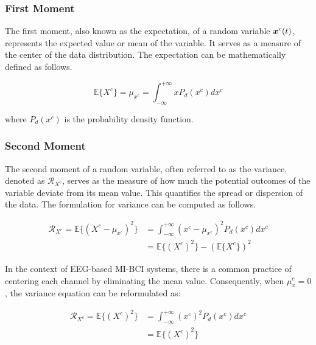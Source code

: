 \subsubsection{First Moment}

The first moment, also known as the expectation, of a random variable $\bm {x}^c(t)$, represents the expected value or mean of the variable. It serves as a measure of the center of the data distribution. The expectation can be mathematically defined as follows.

\begin{equation}
    \mathbb{E}\{X^{c}\} = \mu_{x^{c}} = \int_{-\infty}^{+\infty} x P_d(x^{c}) dx^{c}
\end{equation}

where $P_d(x^{c})$ is the probability density function.

\subsubsection{Second Moment}

The second moment of a random variable, often referred to as the variance, denoted as $\mathcal{R}_{X^c}$, serves as the measure of how much the potential outcomes of the variable deviate from its mean value. This quantifies the spread or dispersion of the data. The formulation for variance can be computed as follows.

\begin{equation}
  \begin{split}
    \mathcal{R}_{X^c} = \mathbb{E}\{(X^{c} - \mu_{x^{c}})^2\} &= \int_{-\infty}^{+\infty} \left( x^{c}-\mu_{x^{c}} \right) ^2 P_d(x^{c}) dx^{c} \\
    &= \mathbb{E}\{(X^{c})^2\} - (\mathbb{E}\{X^{c}\})^2
  \end{split}
\end{equation}

In the context of EEG-based MI-BCI systems, there is a common practice of centering each channel by eliminating the mean value. Consequently, when $\mu_x^{c}=0$, the variance equation can be reformulated as:

\begin{equation}
  \begin{split}
    \mathcal{R}_{X^c} = \mathbb{E}\{(X^{c})^2\} &= \int_{-\infty}^{+\infty}  (x^{c})^2 P_d(x^{c}) dx^{c} \\
    &= \mathbb{E}\{(X^{c})^2\}
  \end{split}
\end{equation}

